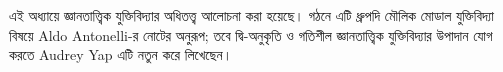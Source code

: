 \documentclass[../../../include/open-logic-chapter]{subfiles}
\begin{document}

\begin{editorial}
  এই অধ্যায়ে জ্ঞানতাত্ত্বিক যুক্তিবিদ্যার অধিতত্ত্ব আলোচনা করা হয়েছে। গঠনে এটি ধ্রুপদি মৌলিক মোডাল যুক্তিবিদ্যা বিষয়ে Aldo Antonelli-র নোটের অনুরূপ; তবে দ্বি-অনুকৃতি ও গতিশীল জ্ঞানতাত্ত্বিক যুক্তিবিদ্যার উপাদান যোগ করতে Audrey Yap এটি নতুন করে লিখেছেন।
\end{editorial}



\OLEndChapterHook
\end{document}
